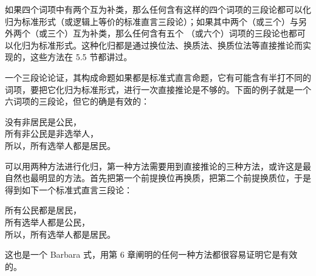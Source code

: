 如果四个词项中有两个互为补类，那么任何含有这样的四个词项的三段论都可以化归为标准形式（或逻辑上等价的标准直言三段论）；如果其中两个（或三个）与另外两个（或三个）互为补类，那么任何含有五个 （或六个）词项的三段论也都可以化归为标准形式。这种化归都是通过换位法、换质法、换质位法等直接推论而实现的，这些方法在 5.5 节都讲过。

一个三段论论证，其构成命题如果都是标准式直言命题，它有可能含有半打不同的词项，要把它化归为标准形式，进行一次直接推论是不够的。下面的例子就是一个六词项的三段论，但它的确是有效的：

没有非居民是公民，\\
所有非公民是非选举人，\\
所以，所有选举人都是居民。

可以用两种方法进行化归，第一种方法需要用到直接推论的三种方法，或许这是最自然也最明显的方法。首先把第一个前提换位再换质，把第二个前提换质位，于是得到如下一个标准式直言三段论：

所有公民都是居民，\\
所有选举人都是公民，\\
所以，所有选举人都是居民。

这也是一个 Barbara 式，用第 6 章阐明的任何一种方法都很容易证明它是有效的。 
